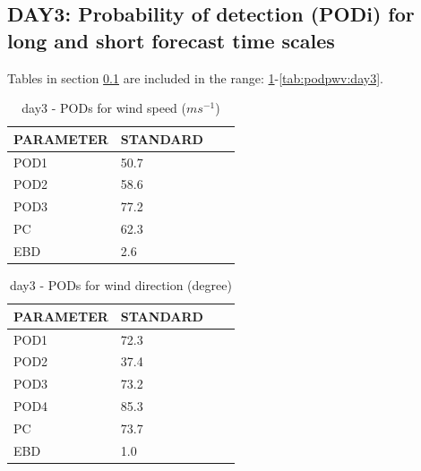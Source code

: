 \subsection{DAY3: Probability of detection (PODi) for long and short forecast time scales}\label{subsec:day3:pod}
Tables in section \ref{subsec:day3:pod} are included in the range: \ref{tab:podws:day3}-\ref{tab:podpwv:day3}.
\begin{table}[h!]
\begin{center}
\begin{tabular}{|l|l|l|l|}
\hline
\multicolumn{1}{|c|}{\cellcolor[HTML]{C0C0C0}\textbf{PARAMETER}} & \multicolumn{1}{c|}{\cellcolor[HTML]{C0C0C0}\textbf{STANDARD}} \\
\hline
\cellcolor[HTML]{C0C0C0}POD1  & 50.7                                \\
\cellcolor[HTML]{C0C0C0}POD2  & 58.6                                \\
\cellcolor[HTML]{C0C0C0}POD3  & 77.2                                \\
\cellcolor[HTML]{C0C0C0}PC    & 62.3                                  \\
\cellcolor[HTML]{C0C0C0}EBD   & 2.6                                 \\
\hline
\end{tabular}
\caption{day3 - PODs for wind speed ($m s^{-1}$)}
\label{tab:podws:day3}
\end{center}
\end{table}
\begin{table}[p!]
\begin{center}
\begin{tabular}{|l|l|l|l|}
\hline
\multicolumn{1}{|c|}{\cellcolor[HTML]{C0C0C0}\textbf{PARAMETER}} & \multicolumn{1}{c|}{\cellcolor[HTML]{C0C0C0}\textbf{STANDARD}}\\
\hline
\cellcolor[HTML]{C0C0C0}POD1  & 72.3      \\
\cellcolor[HTML]{C0C0C0}POD2  & 37.4      \\
\cellcolor[HTML]{C0C0C0}POD3  & 73.2      \\
\cellcolor[HTML]{C0C0C0}POD4  & 85.3      \\
\cellcolor[HTML]{C0C0C0}PC    & 73.7        \\
\cellcolor[HTML]{C0C0C0}EBD   & 1.0       \\
\hline
\end{tabular}
\caption{day3 - PODs for wind direction (degree)}
\label{tab:podwd:day3}
\end{center}
\end{table}
